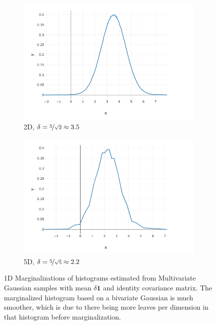 \documentclass[../discussion.tex]{subfiles}
\begin{document}
  \begin{figure}
    \begin{subfigure}{\textwidth}
      \includegraphics[width=0.9\linewidth]{graphics/2d-gauss-5root2mean-marg.png}
      \caption{2D, $\delta = \nicefrac{5}{\sqrt 2} \approx 3.5$}
    \end{subfigure}
    \begin{subfigure}{\textwidth}
      \includegraphics[width=0.9\linewidth]{graphics/5d-gauss-5root5mean-marg.png}
      \caption{5D, $\delta = \nicefrac{5}{\sqrt 5} \approx 2.2$}
    \end{subfigure}
    \caption{
      1D Marginalizations of histograms estimated from
      Multivariate Gaussian samples with mean $\delta \textbf{1}$ and
      identity covariance matrix.
      The marginalized histogram based on a bivariate Gaussian is much smoother,
      which is due to there being more leaves per dimension in that histogram before marginalization.
    } 
    \label{fig:marg-hists}
  \end{figure}
\end{document}
